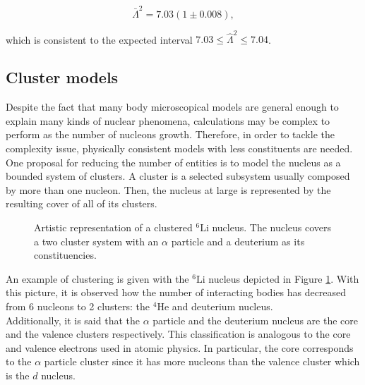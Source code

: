 \documentclass[openany]{book}
\begin{document}
\begin{equation}\label{micro_EFT_ppCNO_Lambda_estimation}
 	\bar \Lambda^2 = 7.03(1 \pm 0.008),
 \end{equation}

which is consistent to the expected interval $7.03 \leq \hat \Lambda^2 \leq 7.04$.

\subsection{Cluster models} \label{sub:microscopical_cluster}

Despite the fact that many body microscopical models are general enough to explain many kinds of nuclear phenomena, calculations may be complex to perform as the number of nucleons growth. Therefore, in order to tackle the complexity issue, physically consistent models with less constituents are needed. \\

One proposal for reducing the number of entities is to model the nucleus as a bounded system of clusters. A cluster is a selected subsystem usually composed by more than one nucleon. Then, the nucleus at large is represented by the resulting cover of all of its clusters.   \\

\begin{figure}[H]
	
	\caption[Clustered $\mathrm{{}^{6}Li}$ nucleus]{Artistic representation of a clustered $\mathrm{{}^{6}Li}$ nucleus. The nucleus covers a two cluster system with an $\alpha$ particle and a deuterium as its constituencies.  }
	\label{fig:microscopical_cluster}
\end{figure}


An example of clustering is given with the $\mathrm{{}^{6}Li}$ nucleus depicted in Figure \ref{fig:microscopical_cluster}. With this picture, it is observed how the number of interacting bodies has decreased from 6 nucleons to 2 clusters: the  $\mathrm{{}^{4}He}$ and deuterium nucleus.  \\

Additionally, it is said that the $\alpha$ particle and the deuterium nucleus are the core and the valence clusters respectively. This classification is analogous to the core and valence electrons used in atomic physics. In particular, the core corresponds to the $\alpha$ particle cluster since it has more nucleons than the valence cluster which is the $d$ nucleus.  \\
\end{document}
